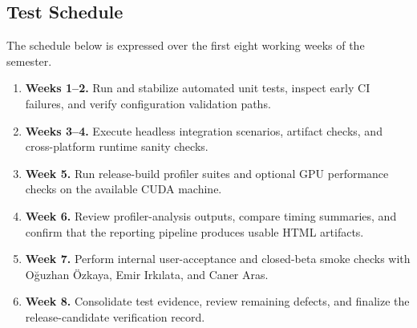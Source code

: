 \subsection{Test Schedule}

The schedule below is expressed over the first eight working weeks of the semester.

\begin{enumerate}[leftmargin=*]
	\item \textbf{Weeks 1--2.} Run and stabilize automated unit tests, inspect early CI
	      failures, and verify configuration validation paths.

	\item \textbf{Weeks 3--4.} Execute headless integration scenarios, artifact checks, and
	      cross-platform runtime sanity checks.

	\item \textbf{Week 5.} Run release-build profiler suites and optional GPU performance
	      checks on the available CUDA machine.

	\item \textbf{Week 6.} Review profiler-analysis outputs, compare timing summaries, and
	      confirm that the reporting pipeline produces usable HTML artifacts.

	\item \textbf{Week 7.} Perform internal user-acceptance and closed-beta smoke checks with
	      Oğuzhan Özkaya, Emir Irkılata, and Caner Aras.

	\item \textbf{Week 8.} Consolidate test evidence, review remaining defects, and finalize
	      the release-candidate verification record.
\end{enumerate}
